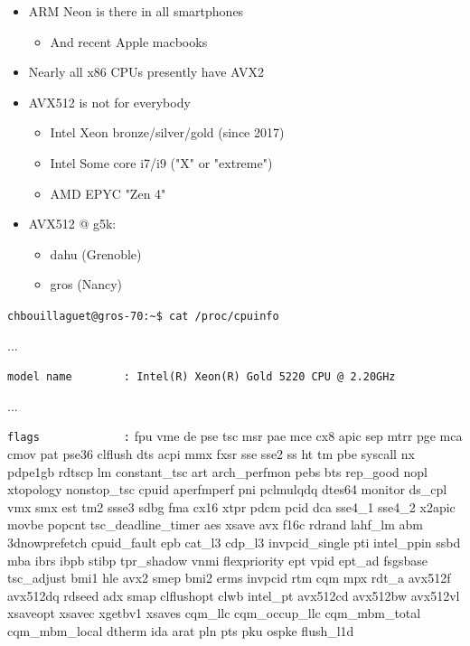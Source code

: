 \documentclass[xcolor={x11names,svgnames}]{beamer}
\begin{document}
\begin{frame}
  \begin{itemize}
  \item ARM Neon is there in all smartphones 
    \begin{itemize}
    \item And recent Apple macbooks
    \end{itemize}
    \medskip
    
    \item Nearly all x86 CPUs presently have AVX2 

      \medskip

    \item AVX512 is not for everybody
      \begin{itemize}
      \item Intel Xeon bronze/silver/gold (since 2017)
      \item Intel Some core i7/i9 ("X" or "extreme") 
      \item AMD EPYC "Zen 4"
      \end{itemize}
    

    \medskip

  \item AVX512 @ g5k:
    \begin{itemize}
    \item dahu (Grenoble)
      \item gros (Nancy) 
    \end{itemize}
    
  \end{itemize}
\end{frame}


\begin{frame}[fragile]

\verb|chbouillaguet@gros-70:~$ cat /proc/cpuinfo|

\ttfamily\scriptsize
...

\verb|model name        : Intel(R) Xeon(R) Gold 5220 CPU @ 2.20GHz|


...

\verb|flags             :| fpu vme de pse tsc msr pae mce cx8 apic sep mtrr pge mca cmov pat pse36 clflush dts acpi \alert{mmx} fxsr \alert{sse sse2} ss ht tm pbe syscall nx pdpe1gb rdtscp lm constant\_tsc art arch\_perfmon pebs bts rep\_good nopl xtopology nonstop\_tsc cpuid aperfmperf pni pclmulqdq dtes64 monitor ds\_cpl vmx smx est tm2 \alert{ssse3} sdbg fma cx16 xtpr pdcm pcid dca \alert{sse4\_1 sse4\_2} x2apic movbe popcnt tsc\_deadline\_timer aes xsave \alert{avx} f16c rdrand lahf\_lm abm 3dnowprefetch cpuid\_fault epb cat\_l3 cdp\_l3 invpcid\_single pti intel\_ppin ssbd mba ibrs ibpb stibp tpr\_shadow vnmi flexpriority ept vpid ept\_ad fsgsbase tsc\_adjust bmi1 hle \alert{avx2} smep bmi2 erms invpcid rtm cqm mpx rdt\_a \alert{avx512f avx512dq} rdseed adx smap clflushopt clwb intel\_pt \alert{avx512cd avx512bw avx512vl} xsaveopt xsavec xgetbv1 xsaves cqm\_llc cqm\_occup\_llc cqm\_mbm\_total cqm\_mbm\_local dtherm ida arat pln pts pku ospke flush\_l1d
\end{frame}
\end{document}
